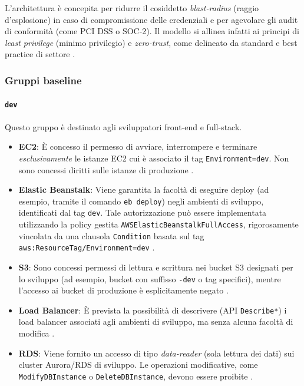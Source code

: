L'architettura è concepita per ridurre il cosiddetto \emph{blast-radius} (raggio d'esplosione) in caso di compromissione delle credenziali e per agevolare gli audit di conformità (come PCI DSS o SOC-2). Il modello si allinea infatti ai principi di \emph{least privilege} (minimo privilegio) e \emph{zero-trust}, come delineato da standard e best practice di settore \cite{NIST_ZTA,NIST_SP80063,PCI_DSS,DatadogLeastPrivilege}.

\subsubsection{Gruppi baseline}
\label{subsubsec:gruppi_base_iam}

\paragraph{\texttt{dev}}
Questo gruppo è destinato agli sviluppatori front-end e full-stack.
\begin{itemize}
  \item \textbf{EC2}: È concesso il permesso di avviare, interrompere e terminare \emph{esclusivamente} le istanze EC2 cui è associato il tag \texttt{Environment=dev}. Non sono concessi diritti sulle istanze di produzione \cite{AWSEC2IAM}.
  \item \textbf{Elastic Beanstalk}: Viene garantita la facoltà di eseguire deploy (ad esempio, tramite il comando \texttt{eb deploy}) negli ambienti di sviluppo, identificati dal tag \texttt{dev}. Tale autorizzazione può essere implementata utilizzando la policy gestita \texttt{AWSElasticBeanstalkFullAccess}, rigorosamente vincolata da una clausola \texttt{Condition} basata sul tag \texttt{aws:ResourceTag/Environment=dev} \cite{AWSEBRole}.
  \item \textbf{S3}: Sono concessi permessi di lettura e scrittura nei bucket S3 designati per lo sviluppo (ad esempio, bucket con suffisso \texttt{-dev} o tag specifici), mentre l'accesso ai bucket di produzione è esplicitamente negato \cite{AWSS3Security}.
  \item \textbf{Load Balancer}: È prevista la possibilità di descrivere (API \texttt{Describe*}) i load balancer associati agli ambienti di sviluppo, ma senza alcuna facoltà di modifica \cite{AWSELBIAM}.
  \item \textbf{RDS}: Viene fornito un accesso di tipo \emph{data-reader} (sola lettura dei dati) sui cluster Aurora/RDS di sviluppo. Le operazioni modificative, come \texttt{ModifyDBInstance} o \texttt{DeleteDBInstance}, devono essere proibite \cite{AWSRDSIAM}.
\end{itemize}

